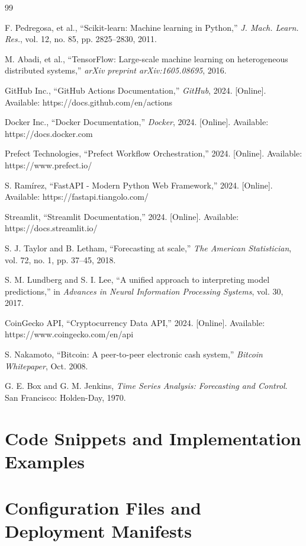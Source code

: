 \documentclass[10pt,conference,a4paper]{IEEEtran}
\begin{document}
\begin{thebibliography}{99}

 F. Pedregosa, et al., ``Scikit-learn: Machine learning in Python,'' \textit{J. Mach. Learn. Res.}, vol. 12, no. 85, pp. 2825--2830, 2011.

 M. Abadi, et al., ``TensorFlow: Large-scale machine learning on heterogeneous distributed systems,'' \textit{arXiv preprint arXiv:1605.08695}, 2016.

 GitHub Inc., ``GitHub Actions Documentation,'' \textit{GitHub}, 2024. [Online]. Available: https://docs.github.com/en/actions

 Docker Inc., ``Docker Documentation,'' \textit{Docker}, 2024. [Online]. Available: https://docs.docker.com

 Prefect Technologies, ``Prefect Workflow Orchestration,'' 2024. [Online]. Available: https://www.prefect.io/

 S. Ramírez, ``FastAPI - Modern Python Web Framework,'' 2024. [Online]. Available: https://fastapi.tiangolo.com/

 Streamlit, ``Streamlit Documentation,'' 2024. [Online]. Available: https://docs.streamlit.io/

 S. J. Taylor and B. Letham, ``Forecasting at scale,'' \textit{The American Statistician}, vol. 72, no. 1, pp. 37--45, 2018.

 S. M. Lundberg and S. I. Lee, ``A unified approach to interpreting model predictions,'' in \textit{Advances in Neural Information Processing Systems}, vol. 30, 2017.

 CoinGecko API, ``Cryptocurrency Data API,'' 2024. [Online]. Available: https://www.coingecko.com/en/api

 S. Nakamoto, ``Bitcoin: A peer-to-peer electronic cash system,'' \textit{Bitcoin Whitepaper}, Oct. 2008.

 G. E. Box and G. M. Jenkins, \textit{Time Series Analysis: Forecasting and Control}. San Francisco: Holden-Day, 1970.

\end{thebibliography}

\appendix

\section{Code Snippets and Implementation Examples}


\section{Configuration Files and Deployment Manifests}

\end{document}
